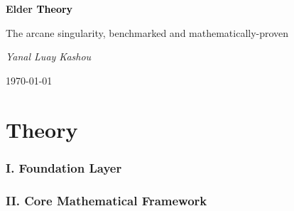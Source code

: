 \documentclass[11pt,twoside]{book}
\begin{document}
\frontmatter

\begin{titlepage}
    \centering
    \vspace*{2cm}
    {\Huge\bfseries \textcolor{DarkSkyBlue}{Elder }\textrm{\textcolor{black}{Theory}}\par}
    \vspace{2cm}
    {\Large The \textcolor{DarkSkyBlue}{arcane} singularity, benchmarked and mathematically-proven\par}
    \vspace{4cm}
    {\Large\itshape Yanal Luay Kashou\par}
    \vfill
    {\large \today\par}
\end{titlepage}

\tableofcontents

\mainmatter







\part{Theory}

\section*{I. Foundation Layer}

\section*{II. Core Mathematical Framework}
\end{document}

